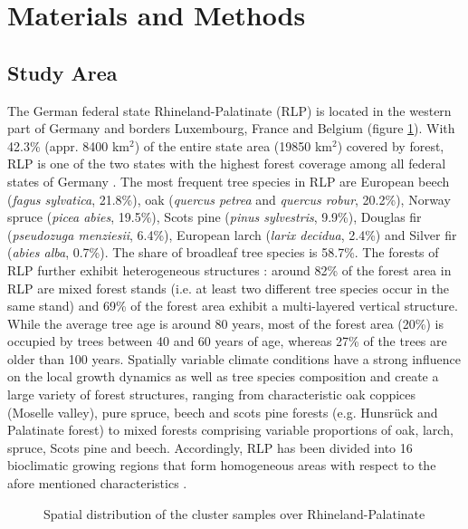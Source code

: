 \section{Materials and Methods}
\label{sec:MatMeth}

\subsection{Study Area}
\label{sec:studyarea}

The German federal state Rhineland-Palatinate (RLP) is located in the western part of Germany and borders Luxembourg, France and Belgium (figure \ref{fig:Study Area}). With 42.3\% (appr. 8400 km$^2$) of the entire state area (19850 km$^2$) covered by forest, RLP is one of the two states with the highest forest coverage among all federal states of Germany \citep{bwi3}. The most frequent tree species in RLP are European beech (\textit{fagus sylvatica}, 21.8\%), oak (\textit{quercus petrea} and \textit{quercus robur}, 20.2\%), Norway spruce (\textit{picea abies}, 19.5\%), Scots pine (\textit{pinus sylvestris}, 9.9\%), Douglas fir (\textit{pseudozuga menziesii}, 6.4\%), European larch (\textit{larix decidua}, 2.4\%) and Silver fir (\textit{abies alba}, 0.7\%). The share of broadleaf tree species is 58.7\%. The forests of RLP further exhibit heterogeneous structures \citep{bwi3}: around 82\% of the forest area in RLP are mixed forest stands (i.e. at least two different tree species occur in the same stand) and 69\% of the forest area exhibit a multi-layered vertical structure. While the average tree age is around 80 years, most of the forest area (20\%) is occupied by trees between 40 and 60 years of age, whereas 27\% of the trees are older than 100 years. Spatially variable climate conditions have a strong influence on the local growth dynamics as well as tree species composition and create a large variety of forest structures, ranging from characteristic oak coppices (Moselle valley), pure spruce, beech and scots pine forests (e.g. Hunsr{\"u}ck and Palatinate forest) to mixed forests comprising variable proportions of oak, larch, spruce, Scots pine and beech. Accordingly, RLP has been divided into 16 bioclimatic growing regions that form homogeneous areas with respect to the afore mentioned characteristics \citep{gauer2005}.

\begin{figure}[h]
\centering
{}
\caption{Spatial distribution of the \bwi{} cluster samples over Rhineland-Palatinate}
\label{fig:Study Area}
\end{figure}

